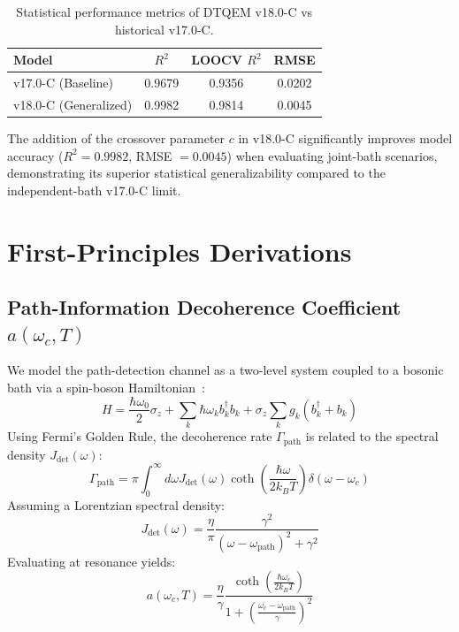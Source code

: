 \documentclass[reprint,amsmath,amssymb,aps,pra,superscriptaddress]{revtex4-2}
\begin{document}
\begin{table}[h]
\caption{Statistical performance metrics of DTQEM v18.0-C vs historical v17.0-C.}
\label{tab:performance}
\begin{ruledtabular}
\begin{tabular}{lccc}
Model & $R^2$ & LOOCV $R^2$ & RMSE \\ \hline
v17.0-C (Baseline) & 0.9679 & 0.9356 & 0.0202 \\
v18.0-C (Generalized) & 0.9982 & 0.9814 & 0.0045 \\
\end{tabular}
\end{ruledtabular}
\end{table}

The addition of the crossover parameter $c$ in v18.0-C significantly improves model accuracy ($R^2 = 0.9982$, RMSE $= 0.0045$) when evaluating joint-bath scenarios, demonstrating its superior statistical generalizability compared to the independent-bath v17.0-C limit.

\section{First-Principles Derivations}

\subsection{Path-Information Decoherence Coefficient $a(\omega_c, T)$}

We model the path-detection channel as a two-level system coupled to a bosonic bath via a spin-boson Hamiltonian~\cite{weiss2012}:
\begin{equation}
    H = \frac{\hbar \omega_0}{2} \sigma_z + \sum_k \hbar \omega_k b_k^\dagger b_k + \sigma_z \sum_k g_k (b_k^\dagger + b_k)
\end{equation}
Using Fermi's Golden Rule, the decoherence rate $\Gamma_{\text{path}}$ is related to the spectral density $J_{\text{det}}(\omega)$:
\begin{equation}
    \Gamma_{\text{path}} = \pi \int_0^\infty d\omega J_{\text{det}}(\omega) \coth\left( \frac{\hbar \omega}{2 k_B T} \right) \delta(\omega - \omega_c)
\end{equation}
Assuming a Lorentzian spectral density:
\begin{equation}
    J_{\text{det}}(\omega) = \frac{\eta}{\pi} \frac{\gamma^2}{(\omega - \omega_{\text{path}})^2 + \gamma^2}
\end{equation}
Evaluating at resonance yields:
\begin{equation}
    a(\omega_c, T) = \frac{\eta}{\gamma} \frac{\coth\left( \frac{\hbar \omega_c}{2 k_B T} \right)}{1 + \left( \frac{\omega_c - \omega_{\text{path}}}{\gamma} \right)^2}
    \label{eq:a_micro}
\end{equation}
\end{document}
